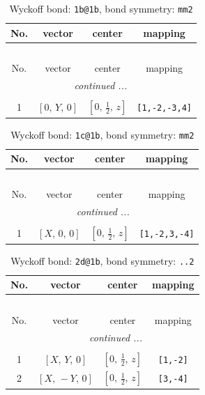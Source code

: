\documentclass[fleqn,8pt]{jsarticle}
\begin{document}
\begin{longtable}{cccc}
\caption{Wyckoff bond: {\tt 1b@1b}, bond symmetry: {\tt mm2}}
 \\
 \hline \hline
No. & vector & center & mapping \\ \hline \endfirsthead

\multicolumn{3}{l}{\tablename\ \thetable{}} \\
 \hline \hline
No. & vector & center & mapping \\ \hline \endhead

 \hline \hline
\multicolumn{3}{r}{\footnotesize\it continued ...} \\ \endfoot

 \hline \hline
\multicolumn{3}{r}{} \\ \endlastfoot

1 & $\left[ 0,\, Y,\, 0 \right]$ & $\left[ 0,\, \frac{1}{2},\, z \right]$ & {\tt [1,-2,-3,4]} \\
\end{longtable}
\renewcommand{\arraystretch}{1.2}
\begin{longtable}{cccc}
\caption{Wyckoff bond: {\tt 1c@1b}, bond symmetry: {\tt mm2}}
 \\
 \hline \hline
No. & vector & center & mapping \\ \hline \endfirsthead

\multicolumn{3}{l}{\tablename\ \thetable{}} \\
 \hline \hline
No. & vector & center & mapping \\ \hline \endhead

 \hline \hline
\multicolumn{3}{r}{\footnotesize\it continued ...} \\ \endfoot

 \hline \hline
\multicolumn{3}{r}{} \\ \endlastfoot

1 & $\left[ X,\, 0,\, 0 \right]$ & $\left[ 0,\, \frac{1}{2},\, z \right]$ & {\tt [1,-2,3,-4]} \\
\end{longtable}
\renewcommand{\arraystretch}{1.2}
\begin{longtable}{cccc}
\caption{Wyckoff bond: {\tt 2d@1b}, bond symmetry: {\tt ..2}}
 \\
 \hline \hline
No. & vector & center & mapping \\ \hline \endfirsthead

\multicolumn{3}{l}{\tablename\ \thetable{}} \\
 \hline \hline
No. & vector & center & mapping \\ \hline \endhead

 \hline \hline
\multicolumn{3}{r}{\footnotesize\it continued ...} \\ \endfoot

 \hline \hline
\multicolumn{3}{r}{} \\ \endlastfoot

1 & $\left[ X,\, Y,\, 0 \right]$ & $\left[ 0,\, \frac{1}{2},\, z \right]$ & {\tt [1,-2]} \\ \hline
2 & $\left[ X,\, - Y,\, 0 \right]$ & $\left[ 0,\, \frac{1}{2},\, z \right]$ & {\tt [3,-4]} \\
\end{longtable}
\end{document}
